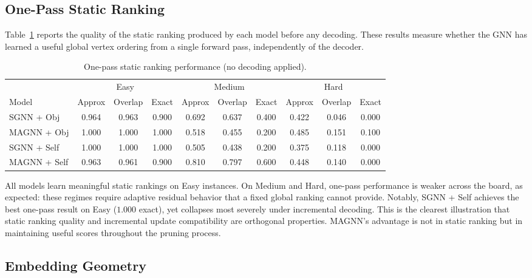 \documentclass[11pt]{article}
\theoremstyle{plain}
\theoremstyle{definition}
\theoremstyle{remark}
\begin{document}
\subsection{One-Pass Static Ranking}
\label{sec:onepass}

Table~\ref{tab:onepass} reports the quality of the static ranking produced by each
model before any decoding. These results measure whether the GNN has learned a useful
global vertex ordering from a single forward pass, independently of the decoder.

\begin{table}[t]
  \centering
  \caption{One-pass static ranking performance (no decoding applied).}
  \label{tab:onepass}
  \begin{tabular}{lccccccccc}
    \toprule
    & \multicolumn{3}{c}{Easy} & \multicolumn{3}{c}{Medium}
    & \multicolumn{3}{c}{Hard} \\
    \cmidrule(lr){2-4}\cmidrule(lr){5-7}\cmidrule(lr){8-10}
    Model & Approx & Overlap & Exact
    & Approx & Overlap & Exact
    & Approx & Overlap & Exact \\
    \midrule
    SGNN + Obj
    & 0.964 & 0.963 & 0.900 & 0.692 & 0.637 & 0.400 & 0.422 & 0.046 & 0.000 \\
    MAGNN + Obj
    & 1.000 & 1.000 & 1.000 & 0.518 & 0.455 & 0.200 & 0.485 & 0.151 & 0.100 \\
    SGNN + Self
    & 1.000 & 1.000 & 1.000 & 0.505 & 0.438 & 0.200 & 0.375 & 0.118 & 0.000 \\
    MAGNN + Self
    & 0.963 & 0.961 & 0.900 & 0.810 & 0.797 & 0.600 & 0.448 & 0.140 & 0.000 \\
    \bottomrule
  \end{tabular}
\end{table}

All models learn meaningful static rankings on Easy instances. On Medium and Hard,
one-pass performance is weaker across the board, as expected: these regimes require
adaptive residual behavior that a fixed global ranking cannot provide. Notably, SGNN
+ Self achieves the best one-pass result on Easy ($1.000$ exact), yet collapses most
severely under incremental decoding. This is the clearest illustration that static
ranking quality and incremental update compatibility are orthogonal properties.
MAGNN's advantage is not in static ranking but in maintaining useful scores
throughout the pruning process.

\subsection{Embedding Geometry}
\label{sec:pca}
\end{document}
